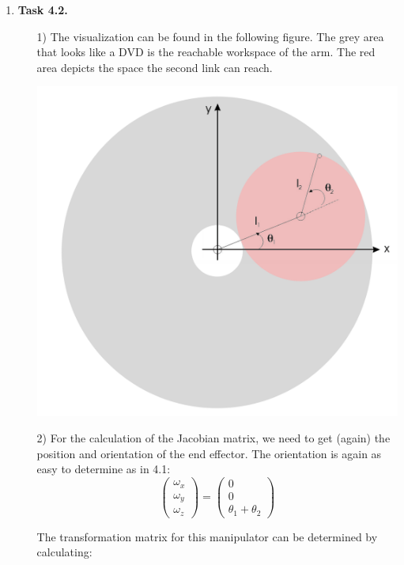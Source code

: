 \documentclass[a4paper,11pt]{article}
\begin{document}
\begin {enumerate}
		
	\item[\textbf{Task 4.2.}]
		\begin{enumerate}
			\item[1)] The visualization can be found in the following figure. The grey area that looks like a DVD is the reachable workspace of the arm. The red area depicts the space the second link can reach.
			\begin{center}
				\includegraphics[scale=0.2]{4-2-1.png}
			\end{center}
			
			\item[2)]
				For the calculation of the Jacobian matrix, we need to get (again) the position and orientation of the end effector. The orientation is again as easy to determine as in 4.1:
				$$\begin{pmatrix}
					\omega_x \\
					\omega_y \\
					\omega_z
				\end{pmatrix} = \begin{pmatrix}
					0 \\
					0 \\
					\theta_1 + \theta_2
				\end{pmatrix}$$
				
				The transformation matrix for this manipulator can be determined by calculating:
				

\end{enumerate}
\end{enumerate}
\end{document}
